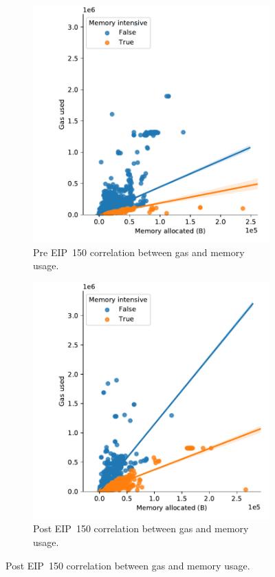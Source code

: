 \begin{figure}[t!]
	\begin{subfigure}{.8\columnwidth}
		\centering\includegraphics[width=.8\columnwidth]{figures/memory-usage-1400000-1500000.pdf}
		\caption{Pre EIP~150 correlation between gas and memory usage.}
		\label{fig:gas-memory-pre-eip150}
	\end{subfigure}

	\begin{subfigure}{.8\columnwidth}
		\centering\includegraphics[width=.8\columnwidth]{figures/memory-usage-2500000-2600000.pdf}
		\caption{Post EIP~150 correlation between gas and memory usage.}
		\label{fig:gas-memory-post-eip150}
	\end{subfigure}


\end{figure}
